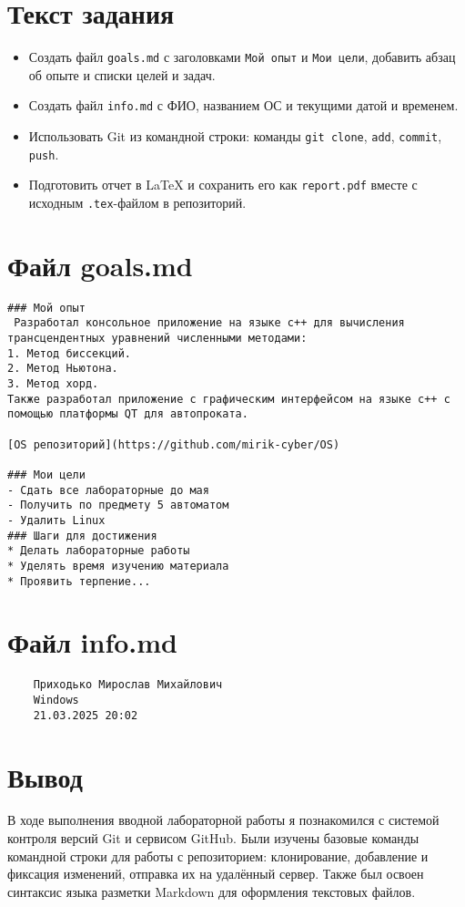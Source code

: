 \documentclass{article}
\begin{document}
\section*{Текст задания}
\begin{itemize}
    \item Создать файл \texttt{goals.md} с заголовками \texttt{Мой опыт} и \texttt{Мои цели}, добавить абзац об опыте и списки целей и задач.
    \item Создать файл \texttt{info.md} с ФИО, названием ОС и текущими датой и временем.
    \item Использовать Git из командной строки: команды \texttt{git clone}, \texttt{add}, \texttt{commit}, \texttt{push}.
    \item Подготовить отчет в \LaTeX{} и сохранить его как \texttt{report.pdf} вместе с исходным \texttt{.tex}-файлом в репозиторий.
\end{itemize}

\section*{Файл goals.md}
\begin{lstlisting}
### Мой опыт                                   
 Разработал консольное приложение на языке c++ для вычисления трансцендентных уравнений численными методами:
1. Метод биссекций.
2. Метод Ньютона.
3. Метод хорд.
Также разработал приложение с графическим интерфейсом на языке c++ с помощью платформы QT для автопроката.

[OS репозиторий](https://github.com/mirik-cyber/OS)

### Мои цели
- Сдать все лабораторные до мая
- Получить по предмету 5 автоматом
- Удалить Linux
### Шаги для достижения
* Делать лабораторные работы
* Уделять время изучению материала
* Проявить терпение...
\end{lstlisting}
\section*{Файл info.md}
\begin{lstlisting}
    Приходько Мирослав Михайлович
    Windows
    21.03.2025 20:02
\end{lstlisting}
\section*{Вывод}
В ходе выполнения вводной лабораторной работы я познакомился с системой контроля версий Git и сервисом GitHub. Были изучены базовые команды командной строки для работы с репозиторием: клонирование, добавление и фиксация изменений, отправка их на удалённый сервер. Также был освоен синтаксис языка разметки Markdown для оформления текстовых файлов.
\end{document}
